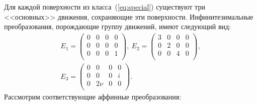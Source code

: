 \documentclass[../main.tex]{subfiles}
\begin{document}
Для каждой поверхности из класса~(\ref{eq:special}) существуют три <<основных>> движения, сохраняющие эти поверхности. Инфинитезимальные преобразования, порождающие группу движений, имеют следующий вид:
\begin{gather*}
E_1 = 
\left(
\begin{array}{cccc}
 0 & 0 & 0 & 0 \\
 0 & 0 & 0 & 0 \\
 0 & 0 & 0 & 1 \\
\end{array}
\right),~
E_2 = \left(
\begin{array}{cccc}
 3 & 0 & 0 & 0 \\
 0 & 2 & 0 & 0 \\
 0 & 0 & 4 & 0 \\
\end{array}
\right),\nonumber \\
E_3 = 
\left(
\begin{array}{cccc}
 0 & 0 & 0 & 0 \\
 0 & 0 & 0 & i \\
 0 & 2 \nu  & 0 & 0 \\
\end{array}
\right).
\end{gather*}
Рассмотрим соответствующие аффинные преобразования:
\end{document}
